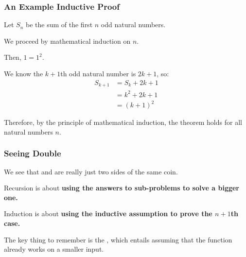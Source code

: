 \documentclass[aspectratio=169, handout]{beamer}
\begin{document}
\begin{frame}[fragile]
  \frametitle{An Example Inductive Proof}

  { \small
  Let $S_n$ be the sum of the first $n$ odd natural numbers.

  \pause
  \vspace{\fill}


  \pause
  \vspace{\fill}

  We proceed by mathematical induction on $n$.

  \vspace{\fill}

  Then, $1 = 1^2$.

  \vspace{\fill}



  \vspace{\fill}

  We know the $k + 1$th odd natural number is $2k + 1$, so:
  \begin{align*}
    S_{k + 1} &= S_k + 2k + 1 \\
              &= k^2 + 2k + 1 \\
              &= (k + 1)^2
  \end{align*}

  Therefore, by the principle of mathematical induction, the theorem holds
  for all natural numbers $n$.
  }
\end{frame}

\begin{frame}[fragile]
  \frametitle{Seeing Double}

  We see that  and  are really just two sides of the same coin.

  \pause
  \vspace{\fill}

  Recursion is about \textbf{using the answers to sub-problems to solve a bigger one.}

  \pause
  \vspace{\fill}

  Induction is about \textbf{using the inductive assumption to prove the $n + 1$th case.}

  \pause
  \vspace{\fill}

  The key thing to remember is the , which entails
  assuming that the function already works on a smaller input.

  \ptmt
\end{frame}
\end{document}
